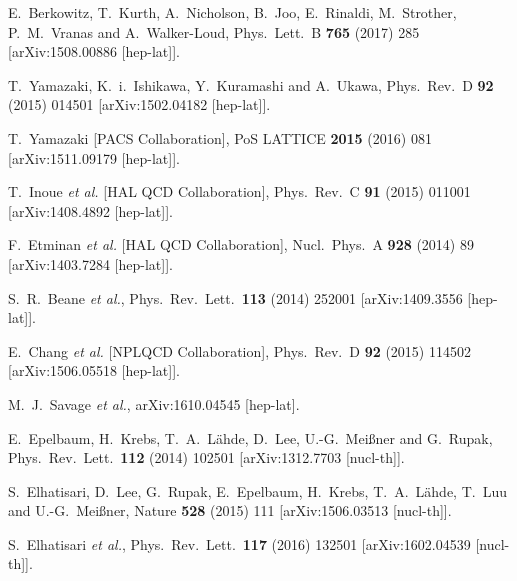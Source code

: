 \documentclass[aps,singlecolumn,superscriptaddress,nofootinbib,tightenlines,
preprintnumbers,showkeys]{revtex4-1}
\begin{document}
\begin{thebibliography}{99}
  E.~Berkowitz, T.~Kurth, A.~Nicholson, B.~Joo, E.~Rinaldi, M.~Strother,
  P.~M.~Vranas and A.~Walker-Loud,
  Phys.\ Lett.\ B {\bf 765} (2017) 285
  [arXiv:1508.00886 [hep-lat]].

  T.~Yamazaki, K.~i.~Ishikawa, Y.~Kuramashi and A.~Ukawa,
  Phys.\ Rev.\ D {\bf 92} (2015) 014501
  [arXiv:1502.04182 [hep-lat]].

  T.~Yamazaki [PACS Collaboration],
  PoS LATTICE {\bf 2015} (2016) 081
  [arXiv:1511.09179 [hep-lat]].

  T.~Inoue {\it et al.} [HAL QCD Collaboration],
  Phys.\ Rev.\ C {\bf 91} (2015) 011001
  [arXiv:1408.4892 [hep-lat]].  

  F.~Etminan {\it et al.} [HAL QCD Collaboration],
  Nucl.\ Phys.\ A {\bf 928} (2014) 89
  [arXiv:1403.7284 [hep-lat]].

  S.~R.~Beane {\it et al.},
  Phys.\ Rev.\ Lett.\ {\bf 113} (2014) 252001
  [arXiv:1409.3556 [hep-lat]].

  E.~Chang {\it et al.} [NPLQCD Collaboration],
  Phys.\ Rev.\ D {\bf 92} (2015) 114502
  [arXiv:1506.05518 [hep-lat]].

  M.~J.~Savage {\it et al.},
  arXiv:1610.04545 [hep-lat].

  E.~Epelbaum, H.~Krebs, T.~A.~Lähde, D.~Lee, U.-G.~Meißner and G.~Rupak,
  Phys.\ Rev.\ Lett.\ {\bf 112} (2014) 102501
  [arXiv:1312.7703 [nucl-th]].

  S.~Elhatisari, D.~Lee, G.~Rupak, E.~Epelbaum, H.~Krebs, T.~A.~Lähde, T.~Luu
  and U.-G.~Meißner,
  Nature {\bf 528} (2015) 111
  [arXiv:1506.03513 [nucl-th]].

  S.~Elhatisari {\it et al.},
  Phys.\ Rev.\ Lett.\ {\bf 117} (2016) 132501
  [arXiv:1602.04539 [nucl-th]].

\end{thebibliography}
\end{document}
